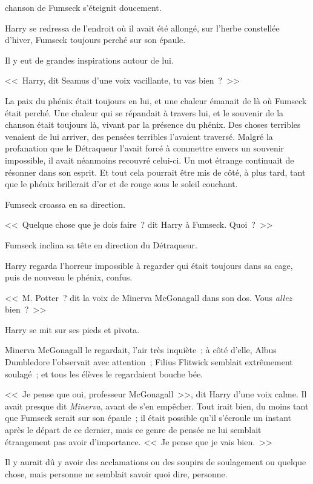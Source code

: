 
 chanson de Fumseck s'éteignit doucement.

\hplettrineextrapara
Harry se redressa de l'endroit où il avait été allongé, sur l'herbe constellée d'hiver, Fumseck toujours perché sur son épaule.

Il y eut de grandes inspirations autour de lui.

<<~Harry, dit Seamus d'une voix vacillante, tu vas bien~?~>>

La paix du phénix était toujours en lui, et une chaleur émanait de là où Fumseck était perché. Une chaleur qui se répandait à travers lui, et le souvenir de la chanson était toujours là, vivant par la présence du phénix. Des choses terribles venaient de lui arriver, des pensées terribles l'avaient traversé. Malgré la profanation que le Détraqueur l'avait forcé à commettre envers un souvenir impossible, il avait néanmoins recouvré celui-ci. Un mot étrange continuait de résonner dans son esprit. Et tout cela pourrait être mis de côté, à plus tard, tant que le phénix brillerait d'or et de rouge sous le soleil couchant.

Fumseck croassa en sa direction.

<<~Quelque chose que je dois faire~? dit Harry à Fumseck. Quoi~?~>>

Fumseck inclina sa tête en direction du Détraqueur.

Harry regarda l'horreur impossible à regarder qui était toujours dans sa cage, puis de nouveau le phénix, confus.

<<~M. Potter~? dit la voix de Minerva McGonagall dans son dos. Vous \emph{allez} bien~?~>>

Harry se mit sur ses pieds et pivota.

Minerva McGonagall le regardait, l'air très inquiète~; à côté d'elle, Albus Dumbledore l'observait avec attention~; Filius Flitwick semblait extrêmement soulagé~; et tous les élèves le regardaient bouche bée.

<<~Je pense que oui, professeur McGonagall~>>, dit Harry d'une voix calme. Il avait presque dit \emph{Minerva}, avant de s'en empêcher. Tout irait bien, du moins tant que Fumseck serait sur son épaule~; il était possible qu'il s'écroule un instant après le départ de ce dernier, mais ce genre de pensée ne lui semblait étrangement pas avoir d'importance. <<~Je pense que je vais bien.~>>

Il y aurait dû y avoir des acclamations ou des soupirs de soulagement ou quelque chose, mais personne ne semblait savoir quoi dire, personne.

